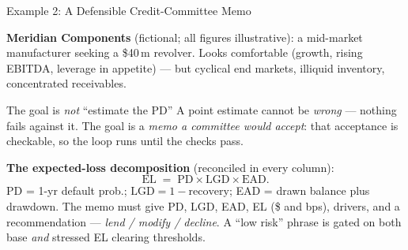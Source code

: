 \documentclass[9pt,t]{beamer}
\begin{document}
\begin{frame}{Example 2: A Defensible Credit-Committee Memo}

\textbf{Meridian Components} (fictional; all figures illustrative): a mid-market
manufacturer seeking a \$40\,m revolver. Looks comfortable (growth, rising EBITDA,
leverage in appetite) --- but cyclical end markets, illiquid inventory,
concentrated receivables.

\medskip
\begin{alertblock}{The goal is \emph{not} ``estimate the PD''}
A point estimate cannot be \emph{wrong} --- nothing fails against it. The goal is
a \emph{memo a committee would accept}: that acceptance is checkable, so the loop
runs until the checks pass.
\end{alertblock}

\medskip
\textbf{The expected-loss decomposition} (reconciled in every column):
\[
  \mathrm{EL} \;=\; \mathrm{PD}\times\mathrm{LGD}\times\mathrm{EAD}.
\]
PD = 1-yr default prob.; $\mathrm{LGD}=1-\text{recovery}$; EAD = drawn balance
plus drawdown. The memo must give PD, LGD, EAD, EL (\$ and bps), drivers, and a
recommendation --- \emph{lend / modify / decline}. A ``low risk'' phrase is gated
on both base \emph{and} stressed EL clearing thresholds.
\end{frame}
\end{document}
